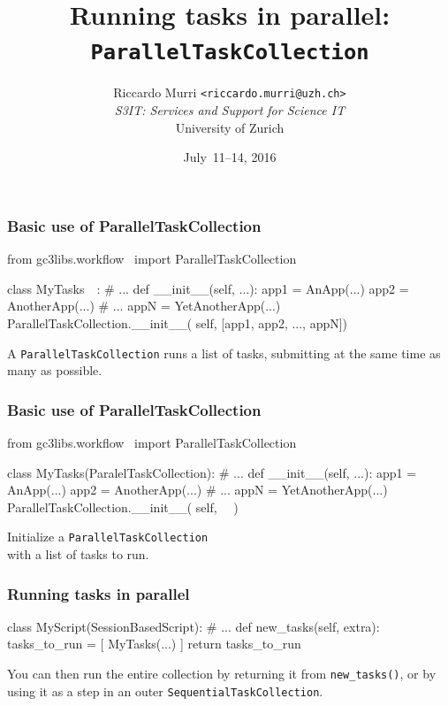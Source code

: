 \documentclass[english,serif,mathserif,xcolor=pdftex,dvipsnames,table]{beamer}
\title[Sequencing tasks]{%
  Running tasks in parallel: \\
  \texttt{ParallelTaskCollection}
}
\author[R. Murri, S3IT UZH]{%
  Riccardo Murri \texttt{<riccardo.murri@uzh.ch>}
  \\[1ex]
  \emph{S3IT: Services and Support for Science IT}
  \\[1ex]
  University of Zurich
}
\date{July~11--14, 2016}
\begin{document}
\maketitle


\begin{frame}[fragile]
  \frametitle{Basic use of ParallelTaskCollection}

\begin{python}
from gc3libs.workflow \
  import ParallelTaskCollection

class MyTasks~~:
  # ...
  def __init__(self, ...):
    app1 = AnApp(...)
    app2 = AnotherApp(...)
    # ...
    appN = YetAnotherApp(...)
    ParallelTaskCollection.__init__(
      self, [app1, app2, ..., appN])
\end{python}

  \+ A \texttt{ParallelTaskCollection} runs a list of tasks, submitting
  at the same time as many as possible.
\end{frame}


\begin{frame}[fragile]
  \frametitle{Basic use of ParallelTaskCollection}

\begin{python}
from gc3libs.workflow \
  import ParallelTaskCollection

class MyTasks(ParalelTaskCollection):
  # ...
  def __init__(self, ...):
    app1 = AnApp(...)
    app2 = AnotherApp(...)
    # ...
    appN = YetAnotherApp(...)
    ParallelTaskCollection.__init__(
      self, ~~)
\end{python}

  \+
  Initialize a \texttt{ParallelTaskCollection} \\
  with a list of tasks to run.
\end{frame}


\begin{frame}[fragile]
  \frametitle{Running tasks in parallel}

\begin{python}
class MyScript(SessionBasedScript):
  # ...
  def new_tasks(self, extra):
    tasks_to_run = [
      MyTasks(...)
    ]
    return tasks_to_run
\end{python}

  \+ You can then run the entire collection by returning it from
  \lstinline|new_tasks()|, or by using it as a step in an outer
  \texttt{SequentialTaskCollection}.
\end{frame}
\end{document}
